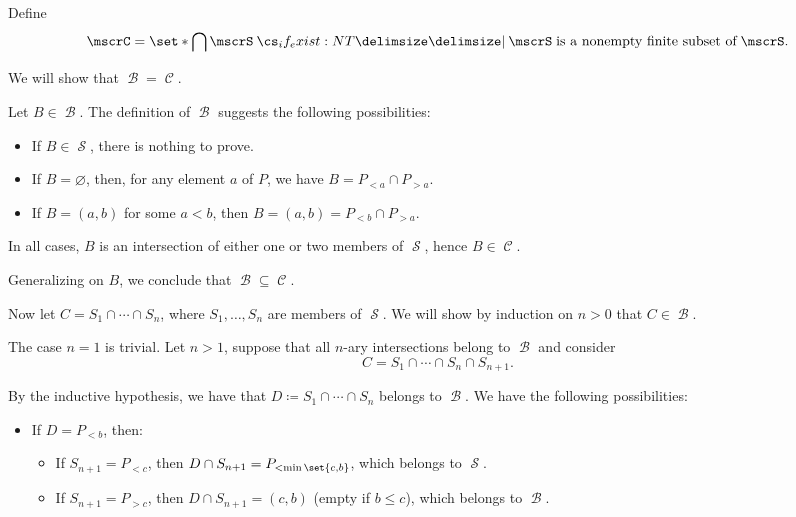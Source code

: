 \begin{defproof}
   Define
  \begin{equation*}
    \mscrC = \set*{ \bigcap \mscrS \given* \mscrS \T{is a nonempty finite subset of} \mscrS }.
  \end{equation*}

  We will show that \( \mscrB = \mscrC \).

   Let \( B \in \mscrB \). The definition of \( \mscrB \) suggests the following possibilities:
  \begin{itemize}
    \item If \( B \in \mscrS \), there is nothing to prove.
    \item If \( B = \varnothing \), then, for any element \( a \) of \( P \), we have \( B = P_{<a} \cap P_{>a} \).
    \item If \( B = (a, b) \) for some \( a < b \), then \( B = (a, b) = P_{<b} \cap P_{>a} \).
  \end{itemize}

  In all cases, \( B \) is an intersection of either one or two members of \( \mscrS \), hence \( B \in \mscrC \).

  Generalizing on \( B \), we conclude that \( \mscrB \subseteq \mscrC \).

   Now let \( C = S_1 \cap \cdots \cap S_n \), where \( S_1, \ldots, S_n \) are members of \( \mscrS \). We will show by induction on \( n > 0 \) that \( C \in \mscrB \).

  The case \( n = 1 \) is trivial. Let \( n > 1 \), suppose that all \( n \)-ary intersections belong to \( \mscrB \) and consider
  \begin{equation*}
    C = S_1 \cap \cdots \cap S_n \cap S_{n+1}.
  \end{equation*}

  By the inductive hypothesis, we have that \( D \coloneqq S_1 \cap \cdots \cap S_n \) belongs to \( \mscrB \). We have the following possibilities:
  \begin{itemize}
    \item If \( D = P_{<b} \), then:
    \begin{itemize}
      \item If \( S_{n+1} = P_{<c} \), then \( D \cap S_{n+1} = P_{<\min\set{c, b}} \), which belongs to \( \mscrS \).
      \item If \( S_{n+1} = P_{>c} \), then \( D \cap S_{n+1} = (c, b) \) (empty if \( b \leq c \)), which belongs to \( \mscrB \).
    \end{itemize}


\end{itemize}
\end{defproof}
